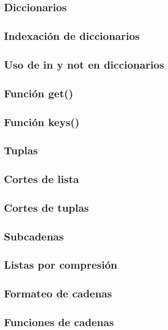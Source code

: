 \documentclass{article}
\begin{document}
\subsection{Diccionarios}

\subsection{Indexación de diccionarios}

\subsection{Uso de in y not en diccionarios}

\subsection{Función get()}

\subsection{Función keys()}

\subsection{Tuplas}

\subsection{Cortes de lista}

\subsection{Cortes de tuplas}

\subsection{Subcadenas}

\subsection{Listas por compresión}

\subsection{Formateo de cadenas}

\subsection{Funciones de cadenas}
\end{document}
